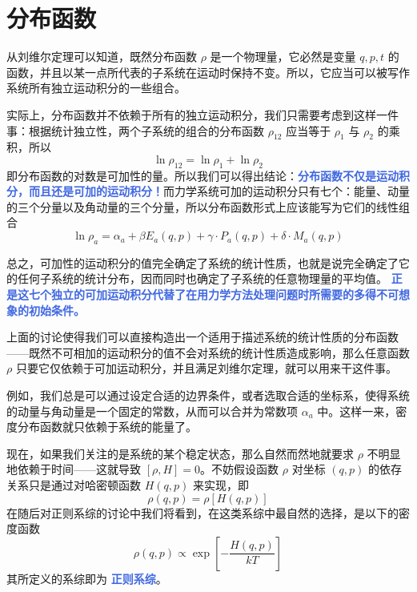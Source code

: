 \documentclass[hyperref,UTF-8]{ctexbook}
\newcommand{\0}{\boldsymbol{0}}
\begin{document}
\section{分布函数}\label{sec:分布函数}

从刘维尔定理可以知道，既然分布函数 $\rho$ 是一个物理量，它必然是变量 $q,p,t$ 的函数，并且以某一点所代表的子系统在运动时保持不变。所以，它应当可以被写作系统所有独立运动积分的一些组合。

实际上，分布函数并不依赖于所有的独立运动积分，我们只需要考虑到这样一件事：根据统计独立性，两个子系统的组合的分布函数 $\rho_{12}$ 应当等于 $\rho_1$ 与 $\rho_2$ 的乘积，所以
\begin{equation}\label{equ:jiahe}
    \ln\rho_{12} = \ln \rho_1 + \ln \rho_2
\end{equation}
即分布函数的对数是可加性的量。所以我们可以得出结论：\textcolor{RoyalBlue}{\textbf{\kaishu 分布函数不仅是运动积分，而且还是可加的运动积分！}}而力学系统可加的运动积分只有七个：能量、动量的三个分量以及角动量的三个分量，所以分布函数形式上应该能写为它们的线性组合
\begin{equation}\label{equ:linearcombination}
    \ln \rho_a = \alpha_a + \beta E_a(q,p) + \gamma \cdot P_a(q,p) + \delta \cdot M_a (q,p)
\end{equation}

总之，可加性的运动积分的值完全确定了系统的统计性质，也就是说完全确定了它的任何子系统的统计分布，因而同时也确定了子系统的任意物理量的平均值。 \textcolor{RoyalBlue}{\textbf{\kaishu 正是这七个独立的可加运动积分代替了在用力学方法处理问题时所需要的多得不可想象的初始条件。}}

上面的讨论使得我们可以直接构造出一个适用于描述系统的统计性质的分布函数——既然不可相加的运动积分的值不会对系统的统计性质造成影响，那么任意函数 $\rho$ 只要它仅依赖于可加运动积分，并且满足刘维尔定理，就可以用来干这件事。

例如，我们总是可以通过设定合适的边界条件，或者选取合适的坐标系，使得系统的动量与角动量是一个固定的常数，从而可以合并为常数项 $\alpha_a$ 中。这样一来，密度分布函数就只依赖于系统的能量了。

现在，如果我们关注的是系统的某个稳定状态，那么自然而然地就要求 $\rho$ 不明显地依赖于时间——这就导致 $[\rho, H] = 0$。不妨假设函数 $\rho$ 对坐标 $(q,p)$ 的依存关系只是通过对哈密顿函数 $H(q,p)$ 来实现，即
\begin{equation}
    \rho(q,p) = \rho[H(q,p)]
\end{equation} 
在随后对正则系综的讨论中我们将看到，在这类系综中最自然的选择，是以下的密度函数
\begin{equation}
    \rho(q, p) \propto \exp \left[-\frac{H(q, p)}{k T}\right]
\end{equation}
其所定义的系综即为 \textcolor{RoyalBlue}{\textbf{\kaishu 正则系综}}。
\end{document}
